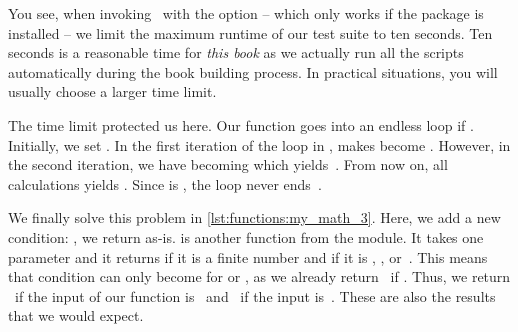 You see, when invoking \pytest\ with the option  -- which only works if the package  is installed -- we limit the maximum runtime of our test suite to ten seconds.
Ten seconds is a reasonable time for \emph{this book} as we actually run all the scripts automatically during the book building process.
In practical situations, you will usually choose a larger time limit.%
%
%
%
\begin{sloppypar}%
The time limit protected us here.
Our  function goes into an endless loop if .
Initially, we set .
In the first iteration of the loop in ,  makes  become .
However, in the second iteration, we have  becoming  which yields~.
From now on, all calculations yields .
Since  is , the loop never ends~\cite{G1991WECSSKAFPA}.%
\end{sloppypar}%
%
%
%
%
%
%
%
%
%
%
\begin{sloppypar}%
We finally solve this problem in \cref{lst:functions:my_math_3}.
Here, we add a new condition: , we return  as-is.
 is another function from the  module.
It takes one parameter and it returns  if it is a finite number and  if it is , , or~.
This means that condition can only become  for  or , as we already return~ if .
Thus, we return ~if the input of our function is~ and ~if the input is~.
These are also the results that we would expect.%
\end{sloppypar}%
